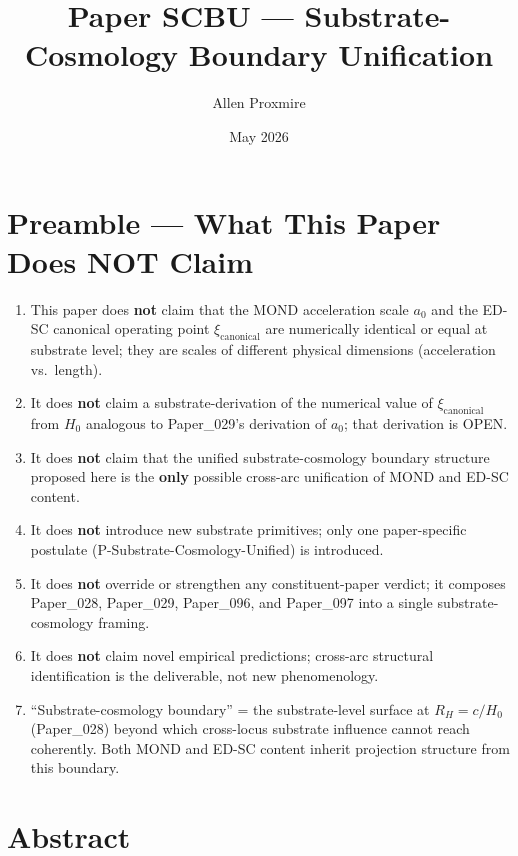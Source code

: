 \documentclass[11pt,a4paper]{article}
\title{\vspace{-1cm}\Large\bfseries Paper SCBU --- Substrate-Cosmology Boundary Unification}
\author{Allen Proxmire}
\date{May 2026}
\begin{document}
\maketitle

\section*{Preamble --- What This Paper Does NOT Claim}

\begin{enumerate}[noitemsep]
\item This paper does \textbf{not} claim that the MOND acceleration scale $a_0$ and the ED-SC canonical operating point $\xi_\mathrm{canonical}$ are numerically identical or equal at substrate level; they are scales of different physical dimensions (acceleration vs.\ length).
\item It does \textbf{not} claim a substrate-derivation of the numerical value of $\xi_\mathrm{canonical}$ from $H_0$ analogous to Paper\_029's derivation of $a_0$; that derivation is OPEN.
\item It does \textbf{not} claim that the unified substrate-cosmology boundary structure proposed here is the \textbf{only} possible cross-arc unification of MOND and ED-SC content.
\item It does \textbf{not} introduce new substrate primitives; only one paper-specific postulate (P-Substrate-Cosmology-Unified) is introduced.
\item It does \textbf{not} override or strengthen any constituent-paper verdict; it composes Paper\_028, Paper\_029, Paper\_096, and Paper\_097 into a single substrate-cosmology framing.
\item It does \textbf{not} claim novel empirical predictions; cross-arc structural identification is the deliverable, not new phenomenology.
\item ``Substrate-cosmology boundary'' = the substrate-level surface at $R_H = c/H_0$ (Paper\_028) beyond which cross-locus substrate influence cannot reach coherently. Both MOND and ED-SC content inherit projection structure from this boundary.
\end{enumerate}

\section*{Abstract}
\end{document}
